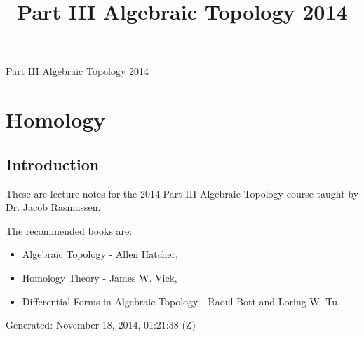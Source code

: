 \documentclass[10pt,]{book}
\title{Part III Algebraic Topology 2014}
\author{}
\date{}
\theoremstyle{plain}
\theoremstyle{definition}
\numberwithin{equation}{section}
\begin{document}
\frontmatter
\thispagestyle{empty}
\begin{center}
{\Huge Part III Algebraic Topology 2014}
\end{center}\par
{}
\clearpage
\thispagestyle{empty}
\clearpage
\maketitle
\clearpage
\thispagestyle{empty}
\clearpage
\setcounter{tocdepth}{1}
\renewcommand*\contentsname{Contents}
\tableofcontents
\mainmatter
\typeout{************************************************}
\typeout{************************************************}
\chapter[Homology]{Homology}\label{chapter-1}
\typeout{************************************************}
\typeout{************************************************}
\section[Introduction]{Introduction}\label{section-1}

          These are lecture notes for the 2014 Part III Algebraic Topology course taught by Dr. Jacob Rasmussen.
\par

          The recommended books are:
          \begin{itemize}
\item{}\href{http://www.math.cornell.edu/~hatcher/AT/ATpage.html}{Algebraic Topology} - Allen Hatcher,\item{}Homology Theory - James W. Vick,\item{}Differential Forms in Algebraic Topology - Raoul Bott and Loring W. Tu.\end{itemize}

\par

          Generated: November 18, 2014, 01:21:38 (Z)
\typeout{************************************************}
\typeout{************************************************}
\end{document}
